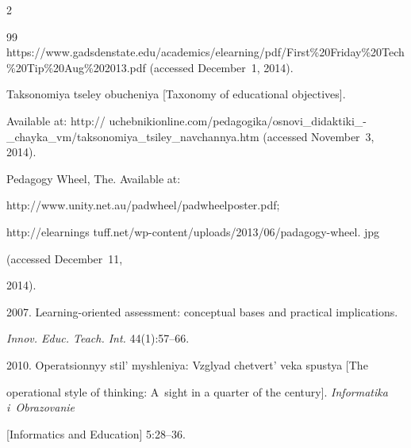 \begin{multicols}{2}
{{\begin{thebibliography}{99}
{https://www.gadsdenstate.edu/academics/\linebreak elearning/pdf/First\%20Friday\%20Tech\%20Tip\%20Aug\linebreak \%202013.pdf} (accessed December~1, 2014).







 Taksonomiya tseley obucheniya [Taxonomy of educational objectives].


Available at: {\sf http:// uchebnikionline.com/pedagogika/osnovi\_didaktiki\_-\_chayka\_vm/taksonomiya\_tsiley\_navchannya.htm} (accessed November~3, 2014).







Pedagogy Wheel, The. Available at:


{\sf http://www.unity.\linebreak net.au/padwheel/padwheelposter.pdf}; {\sf


http://elearnings tuff.net/wp-content/uploads/2013/06/padagogy-wheel. jpg} (accessed December~11,


2014).




 2007. Learning-oriented assessment: conceptual bases and practical implications.


\textit{Innov. Educ.  Teach. Int.} 44(1):57--66.




 2010. Operatsionnyy stil' myshleniya: Vzglyad chetvert' veka spustya [The


operational style of thinking: A~sight in a quarter of the century]. \textit{Informatika i~Obrazovanie}


[Informatics and Education] 5:28--36.


\end{thebibliography}





 }


 }





\end{multicols}





\vspace*{-3pt}





